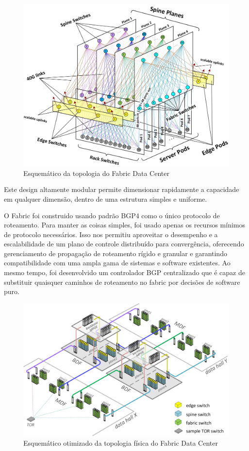 \documentclass[12pt,a4paper]{report}
\begin{document}
\begin{figure}[H]
\centering
\includegraphics[width=.7\textwidth]{imagens/scheme_fabric.jpg}
\caption{Esquemático da topologia do Fabric Data Center}
\label{dc_container}
\end{figure}


Este design altamente modular permite dimensionar rapidamente a capacidade em qualquer dimensão, 
dentro de uma estrutura simples e uniforme.


O Fabric foi construido usando padrão BGP4 como o único protocolo de roteamento. 
Para manter as coisas simples, foi usado apenas os recursos mínimos de protocolo necessários. 
Isso nos permitiu aproveitar o desempenho e a escalabilidade de um plano de controle distribuído para convergência, 
oferecendo gerenciamento de propagação de roteamento rígido e granular e garantindo compatibilidade com uma ampla 
gama de sistemas e software existentes. Ao mesmo tempo, foi desenvolvido um controlador BGP centralizado que é capaz de 
substituir quaisquer caminhos de roteamento no fabric por decisões de software puro. 




\begin{figure}[H]
\centering
\includegraphics[width=.7\textwidth]{imagens/phisic_fabric.jpg}
\caption{Esquemático otimizado da topologia física do Fabric Data Center}
\label{dc_container}
\end{figure}
\end{document}
